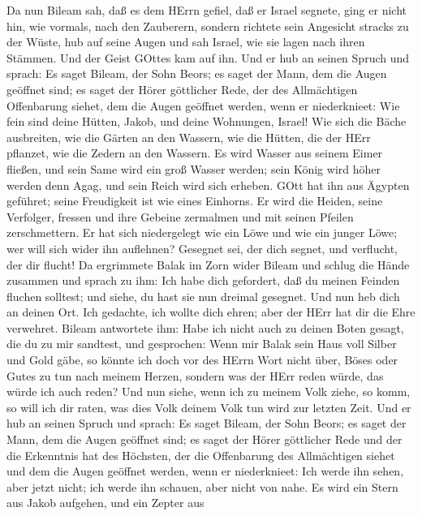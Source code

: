  Da nun Bileam sah, daß es dem HErrn gefiel, daß er Israel
segnete, ging er nicht hin, wie vormals, nach den Zauberern, sondern
richtete sein Angesicht stracks zu der Wüste,  hub auf seine
Augen und sah Israel, wie sie lagen nach ihren Stämmen. Und der Geist
GOttes kam auf ihn.  Und er hub an seinen Spruch und sprach:
Es saget Bileam, der Sohn Beors; es saget der Mann, dem die Augen
geöffnet sind;  es saget der Hörer göttlicher Rede, der des
Allmächtigen Offenbarung siehet, dem die Augen geöffnet werden, wenn er
niederknieet:  Wie fein sind deine Hütten, Jakob, und deine
Wohnungen, Israel!  Wie sich die Bäche ausbreiten, wie die
Gärten an den Wassern, wie die Hütten, die der HErr pflanzet, wie die
Zedern an den Wassern.  Es wird Wasser aus seinem Eimer
fließen, und sein Same wird ein groß Wasser werden; sein König wird
höher werden denn Agag, und sein Reich wird sich erheben. 
GOtt hat ihn aus Ägypten geführet; seine Freudigkeit ist wie eines
Einhorns. Er wird die Heiden, seine Verfolger, fressen und ihre Gebeine
zermalmen und mit seinen Pfeilen zerschmettern.  Er hat sich
niedergelegt wie ein Löwe und wie ein junger Löwe; wer will sich wider
ihn auflehnen? Gesegnet sei, der dich segnet, und verflucht, der dir
flucht!  Da ergrimmete Balak im Zorn wider Bileam und
schlug die Hände zusammen und sprach zu ihm: Ich habe dich gefordert,
daß du meinen Feinden fluchen solltest; und siehe, du hast sie nun
dreimal gesegnet.  Und nun heb dich an deinen Ort. Ich
gedachte, ich wollte dich ehren; aber der HErr hat dir die Ehre
verwehret.  Bileam antwortete ihm: Habe ich nicht auch zu
deinen Boten gesagt, die du zu mir sandtest, und gesprochen:
 Wenn mir Balak sein Haus voll Silber und Gold gäbe, so
könnte ich doch vor des HErrn Wort nicht über, Böses oder Gutes zu tun
nach meinem Herzen, sondern was der HErr reden würde, das würde ich auch
reden?  Und nun siehe, wenn ich zu meinem Volk ziehe, so
komm, so will ich dir raten, was dies Volk deinem Volk tun wird zur
letzten Zeit.  Und er hub an seinen Spruch und sprach: Es
saget Bileam, der Sohn Beors; es saget der Mann, dem die Augen geöffnet
sind;  es saget der Hörer göttlicher Rede und der die
Erkenntnis hat des Höchsten, der die Offenbarung des Allmächtigen siehet
und dem die Augen geöffnet werden, wenn er niederknieet: 
Ich werde ihn sehen, aber jetzt nicht; ich werde ihn schauen, aber nicht
von nahe. Es wird ein Stern aus Jakob aufgehen, und ein Zepter aus
